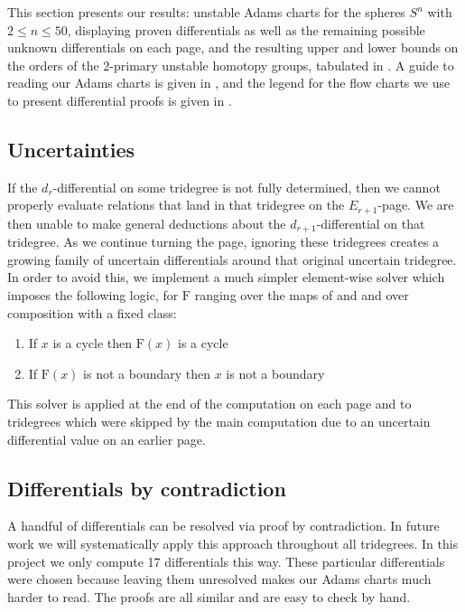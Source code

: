 \documentclass[dvipsnames,table]{amsart}
\theoremstyle{definition}
\theoremstyle{remark}
\numberwithin{equation}{section}
\begin{document}
\noindent
This section presents our results: unstable Adams charts for the spheres $S^n$ with $2 \leq n \leq 50$, displaying proven differentials as well as the remaining possible unknown differentials on each page, and the resulting upper and lower bounds on the orders of the $2$-primary unstable homotopy groups, tabulated in . A guide to reading our Adams charts is given in , and the legend for the flow charts we use to present differential proofs is given in .



\subsection{Uncertainties}
If the $d_r$-differential on some tridegree is not fully determined, then we cannot properly evaluate relations that land in that tridegree on the $E_{r + 1}$-page. We are then unable to make general deductions about the $d_{r + 1}$-differential on that tridegree. As we continue turning the page, ignoring these tridegrees creates a growing family of uncertain differentials around that original uncertain tridegree. In order to avoid this, we implement a much simpler element-wise solver which imposes the following logic, for $\mathrm{F}$ ranging over the maps of  and  and over composition with a fixed class:
\begin{enumerate}
  \item If $x$ is a cycle then $\mathrm{F}(x)$ is a cycle
  \item If $\mathrm{F}(x)$ is not a boundary then $x$ is not a boundary
\end{enumerate}
This solver is applied at the end of the computation on each page and to tridegrees which were skipped by the main computation due to an uncertain differential value on an earlier page.
\subsection{Differentials by contradiction}
A handful of differentials can be resolved via proof by contradiction. In future work we will systematically apply this approach throughout all tridegrees. In this project we only compute 17 differentials this way. These particular differentials were chosen because leaving them unresolved makes our Adams charts much harder to read. The proofs are all similar and are easy to check by hand.
\end{document}
